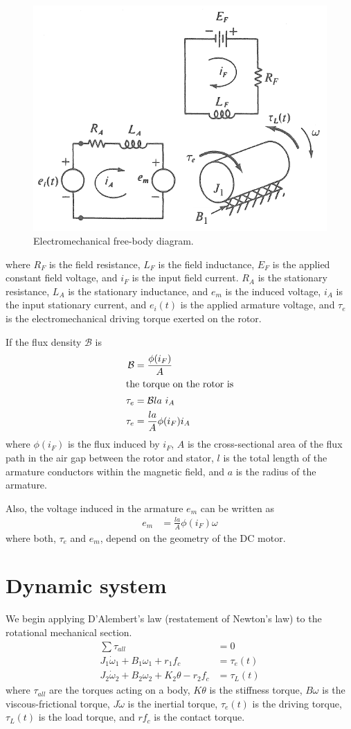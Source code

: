 \documentclass[]{article}
\begin{document}
\begin{figure}[H]
	\centering
	\includegraphics[width=0.5\linewidth]{Electromechanical_free-body}
	\caption{Electromechanical free-body diagram.}
	\label{fig:electromechanical_free-body}
\end{figure}
where $R_F$ is the field resistance, $L_F$ is the field inductance, $E_F$ is the applied constant field voltage, and $i_F$ is the input field current. $R_A$ is the stationary resistance, $L_A$ is the stationary inductance, and $e_m$ is the induced voltage, $i_A$ is the input stationary current, and $e_i(t)$ is the applied armature voltage, and $\tau_e$ is the electromechanical driving torque exerted on the rotor. 

If the flux density $\mathcal{B}$ is
\begin{align}
	\mathcal{B} & = \frac{\phi(i_F)}{A}           \\
	\intertext{the torque on the rotor is}
	\tau_e      & = \mathcal{B} l a~i_A \nonumber \\
	\tau_e      & = \frac{l a}{A} \phi(i_F) i_A \label{eq:tau_e}
\end{align}
where $\phi(i_F)$ is the flux induced by $i_F$, $A$ is the cross-sectional area of the flux path in the air gap between the rotor and stator, $l$ is the total length of the armature conductors within the magnetic field, and $a$ is the radius of the armature.

Also, the voltage induced in the armature $e_m$ can be written as
\begin{align}
	e_m & = \frac{l a}{A} \phi(i_F) \omega
\end{align}
where both, $\tau_e$ and $e_m$, depend on the geometry of the DC motor. 


\section{Dynamic system}
We begin applying D'Alembert's law (restatement of Newton's law) to the rotational mechanical section.
\begin{align}
	\sum \tau_{all}                                          & = 0 \nonumber                 \\
	J_1 \dot{\omega}_1 + B_1 \omega_1 + r_1 f_c              & = \tau_e(t)   \label{eq:Rot1} \\
	J_2 \dot{\omega}_2 + B_2 \omega_2 + K_2 \theta - r_2 f_c & = \tau_L(t)	 \label{eq:Rot2}
\end{align}
where $\tau_{all}$ are the torques acting on a body, $K\theta$ is the stiffness torque, $B\omega$ is the viscous-frictional torque, $J\dot{\omega}$ is the inertial torque, $\tau_e(t)$ is the driving torque,  $\tau_L(t)$ is the load torque, and $r f_c$ is the contact torque.
\end{document}
